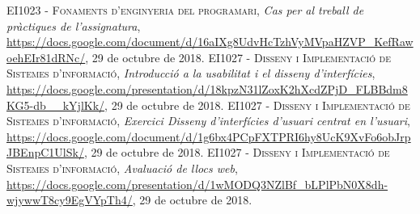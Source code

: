 \documentclass[pdftex,11pt,a4paper]{book}
\begin{document}
%
%

\begin{thebibliography}{X}
 \textsc{EI1023 - Fonaments d’enginyeria del programari},
 \textit{Cas per al treball de pràctiques de l'assignatura},
 \url{https://docs.google.com/document/d/16aIXg8UdvHcTzhVyMVpaHZVP_KefRawoehEIr81dRNc/},
  29 de octubre de 2018.
 \textsc{EI1027 - Disseny i Implementació de Sistemes d'informació},
 \textit{Introducció a la usabilitat i el disseny d'interfícies},
 \url{https://docs.google.com/presentation/d/18kpzN31lZoxK2hXcdZPjD_FLBBdm8KG5-db__kYjlKk/},
  29 de octubre de 2018.
 \textsc{EI1027 - Disseny i Implementació de Sistemes d'informació},
 \textit{Exercici Disseny d’interfícies d’usuari centrat en l’usuari},
 \url{https://docs.google.com/document/d/1g6bx4PCpFXTPRI6hy8UcK9XvFo6obJrpJBEnpC1UlSk/},
  29 de octubre de 2018.
 \textsc{EI1027 - Disseny i Implementació de Sistemes d'informació},
 \textit{Avaluació de llocs web},
 \url{https://docs.google.com/presentation/d/1wMODQ3NZlBf_bLPlPbN0X8dh-wjywwT8cy9EgVYpTh4/},
  29 de octubre de 2018.
\end{thebibliography}



\appendix




\end{document}
